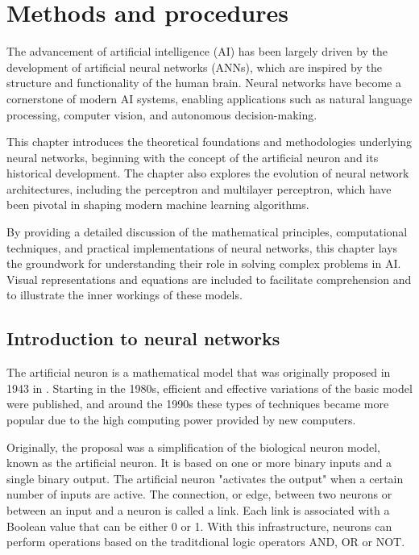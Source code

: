 \chapter{Methods and procedures}
The advancement of artificial intelligence (AI) has been largely driven by the development of artificial neural networks (ANNs), which are inspired by the structure and functionality of the human brain. Neural networks have become a cornerstone of modern AI systems, enabling applications such as natural language processing, computer vision, and autonomous decision-making.

This chapter introduces the theoretical foundations and methodologies underlying neural networks, beginning with the concept of the artificial neuron and its historical development. The chapter also explores the evolution of neural network architectures, including the perceptron and multilayer perceptron, which have been pivotal in shaping modern machine learning algorithms.

By providing a detailed discussion of the mathematical principles, computational techniques, and practical implementations of neural networks, this chapter lays the groundwork for understanding their role in solving complex problems in AI. Visual representations and equations are included to facilitate comprehension and to illustrate the inner workings of these models.
\section{Introduction to neural networks}
The artificial neuron is a mathematical model that was originally proposed in 1943 in \citeauthor{McCulloch1943} \autocite{McCulloch1943}.
Starting in the 1980s, efficient and effective variations of the basic model were published, and around the 1990s these types of techniques became more popular due to the high computing power provided by new computers.

Originally, the proposal was a simplification of the biological neuron model, known as the artificial neuron. It is based on one or more binary inputs and a single binary output. The artificial neuron "activates the output" when a certain number of inputs are active. The connection, or edge, between two neurons or between an input and a neuron is called a link. Each link is associated with a Boolean value that can be either 0 or 1. With this infrastructure, neurons can perform operations based on the traditdional logic operators AND, OR or NOT.


